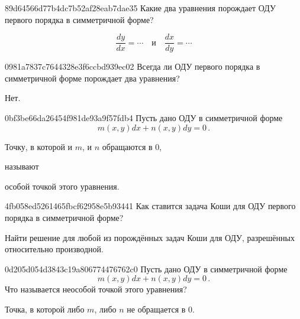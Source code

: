 \begin{note}{89d64566d77b4dc7b52af28eab7dae35}
    Какие два уравнения порождает ОДУ первого порядка в симметричной форме?

    \begin{cloze}{1}
        \[
            \frac{dy}{dx} = \cdots \quad \text{и} \quad \frac{dx}{dy} = \cdots
        \]
    \end{cloze}
\end{note}

\begin{note}{0981a7837c7644328e3f6ccbd939ec02}
    Всегда ли ОДУ первого порядка в симметричной форме порождает два уравнения?

    \begin{cloze}{1}
        Нет.
    \end{cloze}
\end{note}

\begin{note}{0bf3be66da26454f981de93a9f57fdb4}
    Пусть дано ОДУ в симметричной форме
    \[
        m(x, y) dx + n(x, y) dy = 0\,.
    \]
    \begin{icloze}{2}Точку, в которой и \({ m }\), и \({ n }\) обращаются в \({ 0 }\),\end{icloze} называют \begin{icloze}{1}особой точкой этого уравнения.\end{icloze}
\end{note}

\begin{note}{4fb058ed5261465fbcf62958e5b93441}
    Как ставится задача Коши для ОДУ первого порядка в симметричной форме?

    \begin{cloze}{1}
        Найти решение для любой из порождённых задач Коши для ОДУ, разрешённых относительно производной.
    \end{cloze}
\end{note}

\begin{note}{0d205d054d3843c19a806774476762c0}
    Пусть дано ОДУ в симметричной форме
    \[
        m(x, y) dx + n(x, y) dy = 0\,.
    \]
    Что называется неособой точкой этого уравнения?

    \begin{cloze}{1}
        Точка, в которой либо \({ m }\), либо \({ n }\) не обращается в \({ 0 }\).
    \end{cloze}
\end{note}


